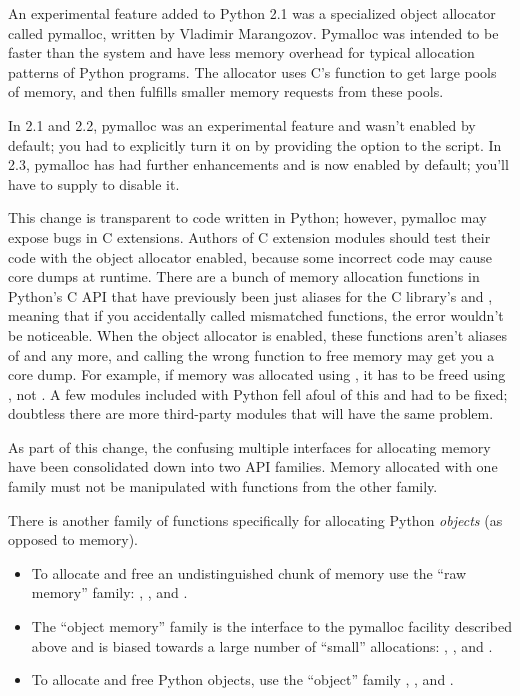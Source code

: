 \documentclass{howto}
\begin{document}
An experimental feature added to Python 2.1 was a specialized object
allocator called pymalloc, written by Vladimir Marangozov.  Pymalloc
was intended to be faster than the system  and have
less memory overhead for typical allocation patterns of Python
programs.  The allocator uses C's  function to get
large pools of memory, and then fulfills smaller memory requests from
these pools.

In 2.1 and 2.2, pymalloc was an experimental feature and wasn't
enabled by default; you had to explicitly turn it on by providing the
 option to the 
script.  In 2.3, pymalloc has had further enhancements and is now
enabled by default; you'll have to supply
 to disable it.

This change is transparent to code written in Python; however,
pymalloc may expose bugs in C extensions.  Authors of C extension
modules should test their code with the object allocator enabled,
because some incorrect code may cause core dumps at runtime.  There
are a bunch of memory allocation functions in Python's C API that have
previously been just aliases for the C library's 
and , meaning that if you accidentally called
mismatched functions, the error wouldn't be noticeable.  When the
object allocator is enabled, these functions aren't aliases of
 and  any more, and calling the
wrong function to free memory may get you a core dump.  For example,
if memory was allocated using , it has to
be freed using , not .  A
few modules included with Python fell afoul of this and had to be
fixed; doubtless there are more third-party modules that will have the
same problem.

As part of this change, the confusing multiple interfaces for
allocating memory have been consolidated down into two API families.
Memory allocated with one family must not be manipulated with
functions from the other family.

There is another family of functions specifically for allocating
Python \emph{objects} (as opposed to memory).

\begin{itemize}
  \item To allocate and free an undistinguished chunk of memory use
  the ``raw memory'' family: ,
  , and .

  \item The ``object memory'' family is the interface to the pymalloc
  facility described above and is biased towards a large number of
  ``small'' allocations: ,
  , and .

  \item To allocate and free Python objects, use the ``object'' family
  , , and
  .
\end{itemize}
\end{document}
